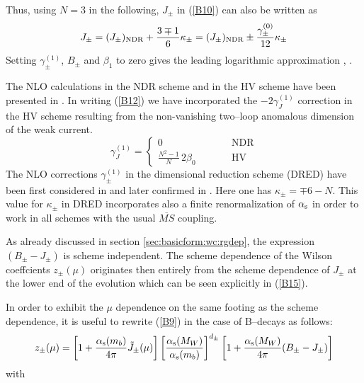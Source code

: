Thus, using $N=3$ in the following, $J_\pm$ in (\ref{B10}) can also be
written as
\begin{equation}\label{B15}
J_\pm=(J_\pm)_{\rm NDR}+\frac{3\mp 1}{6}\kappa_\pm
=(J_\pm)_{\rm NDR}\pm\frac{\gamma^{(0)}_\pm}{12}\kappa_\pm
\end{equation}
Setting $\gamma_\pm^{(1)}$, $B_\pm$ and $\beta_1$ to zero gives the
leading logarithmic approximation \cite{altarelli:74}, \cite{gaillard:74}.

The NLO calculations in the NDR scheme and in the HV scheme have been
presented in \cite{burasweisz:90}.  In writing (\ref{B12}) we have
incorporated the $-2 \gamma^{(1)}_J$ correction in the HV scheme
resulting from the non-vanishing two--loop anomalous dimension of the
weak current.
\begin{equation}
\gamma^{(1)}_J = \left\{
\begin{array}{lcl}
                           0 & \qquad & \mbox{NDR} \\
\frac{N^2 -1}{N} \, 2\beta_0 & \qquad & \mbox{HV}
\end{array}
\right.
\label{eq:wcanom}
\end{equation}
The NLO corrections $\gamma^{(1)}_\pm$ in the
dimensional reduction scheme (DRED) have been first considered in
\cite{altarelli:81} and later confirmed in \cite{burasweisz:90}. Here
one has $\kappa_\pm = \mp 6 - N$. This value for $\kappa_\pm$ in DRED
incorporates also a finite renormalization of $\alpha_{\rm s}$ in order to work in
all schemes with the usual $\overline{MS}$ coupling.

As already discussed in section \ref{sec:basicform:wc:rgdep}, the
expression $(B_\pm-J_\pm)$ is scheme independent.  The scheme
dependence of the Wilson coeffcients $z_\pm(\mu)$ originates then
entirely from the scheme dependence of $J_\pm$ at the lower end of the
evolution which can be seen explicitly in (\ref{B15}).

In order to exhibit the $\mu$ dependence on the same footing as the
scheme dependence, it is useful to rewrite (\ref{B9}) in the case of
B--decays as follows:
\begin{equation}\label{B16}
z_\pm(\mu)=\left[1+\frac{\alpha_{\rm s}(m_b)}{4\pi} \tilde J_\pm(\mu)\right]
      \left[\frac{\alpha_{\rm s}(M_W)}{\alpha_{\rm s}(m_b)}\right]^{d_\pm}
\left[1+\frac{\alpha_{\rm s}(M_W)}{4\pi}(B_\pm-J_\pm)\right]
\end{equation}
with 

